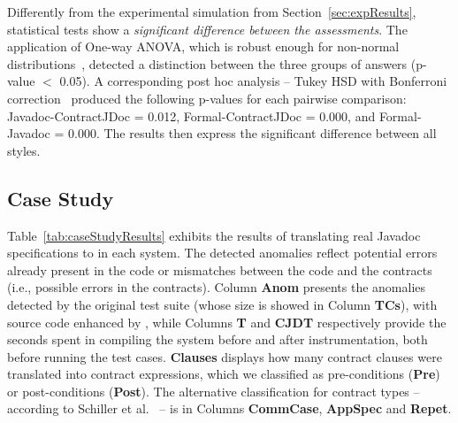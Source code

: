 \begin{figure}
\centering
\end{figure}


Differently from the experimental simulation from Section~\ref{sec:expResults}, statistical tests show a \emph{significant difference between the assessments}. The application of One-way ANOVA, which is robust enough for non-normal distributions~\cite{statistical}, detected a distinction between the three groups of answers (p-value $<$ 0.05). A corresponding post hoc analysis -- Tukey HSD 
with Bonferroni correction~\cite{statistical} produced the following p-values for each pairwise comparison: Javadoc-ContractJDoc = 0.012, Formal-ContractJDoc = 0.000, and Formal-Javadoc = 0.000. The results then express the significant difference between all styles.




\subsection{Case Study}

Table~\ref{tab:caseStudyResults} exhibits the results of translating real Javadoc specifications to \contractjdoc{} in each system.
The detected anomalies reflect potential errors already present in the code or mismatches between the code and the contracts (i.e., possible errors in the contracts).
Column \textbf{Anom} presents the anomalies detected by the original test suite (whose size is showed in Column \textbf{TCs}), with source code enhanced by \contractjdoc{}, while Columns \textbf{T} and \textbf{CJDT} respectively provide the seconds spent in compiling the system before and after \contractjdoc{} instrumentation, both before running the test cases. 
\textbf{Clauses} displays how many contract clauses were translated into contract expressions, which we classified as pre-conditions (\textbf{Pre}) or post-conditions (\textbf{Post}). The alternative classification for contract types -- according to Schiller et al.~\cite{typeContracts} -- is in Columns \textbf{CommCase}, \textbf{AppSpec} and \textbf{Repet}.

